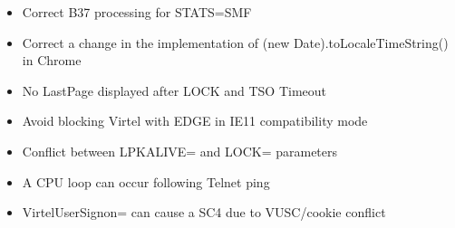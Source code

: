 \documentclass[letterpaper,10pt,english]{sphinxmanual}
\begin{document}
\sphinxAtStartPar
{}
\begin{itemize}
\item {} 
\sphinxAtStartPar
Correct B37 processing for STATS=SMF

\end{itemize}

\sphinxAtStartPar
{}
\begin{itemize}
\item {} 
\sphinxAtStartPar
Correct a change in the implementation of (new Date).toLocaleTimeString() in Chrome

\end{itemize}

\sphinxAtStartPar
{}
\begin{itemize}
\item {} 
\sphinxAtStartPar
No LastPage displayed after LOCK and TSO Timeout

\end{itemize}

\sphinxAtStartPar
{}
\begin{itemize}
\item {} 
\sphinxAtStartPar
Avoid blocking Virtel with EDGE in IE11 compatibility mode

\end{itemize}

\sphinxAtStartPar
{}
\begin{itemize}
\item {} 
\sphinxAtStartPar
Conflict between LPKALIVE= and LOCK= parameters

\end{itemize}

\sphinxAtStartPar
{}
\begin{itemize}
\item {} 
\sphinxAtStartPar
A CPU loop can occur following Telnet ping

\end{itemize}

\sphinxAtStartPar
{}
\begin{itemize}
\item {} 
\sphinxAtStartPar
VirtelUserSignon= can cause a SC4 due to VUSC/cookie conflict

\end{itemize}
\end{document}
